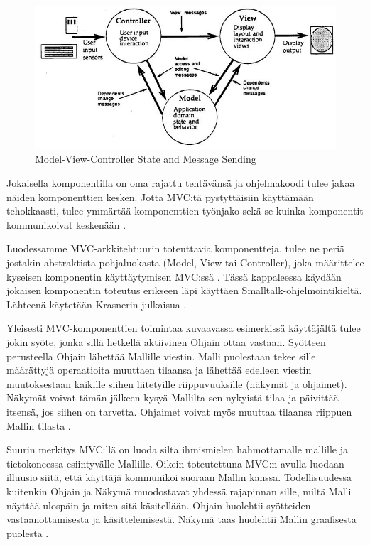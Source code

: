 \documentclass[utf8]{gradu3}
\begin{document}
\begin{figure}[h]
\centering
\includegraphics[scale=0.85]{krasner_mvc.jpg}
\caption{Model-View-Controller State and Message Sending \parencite[s. 5]{krasner_desc}}
\end{figure} 
Jokaisella komponentilla on oma rajattu tehtävänsä ja ohjelmakoodi tulee jakaa näiden komponenttien kesken. Jotta MVC:tä pystyttäisiin käyttämään
tehokkaasti, tulee ymmärtää komponenttien työnjako sekä se kuinka komponentit kommunikoivat keskenään \parencite{burbeck}. 

Luodessamme MVC-arkkitehtuurin toteuttavia komponentteja, tulee ne periä jostakin abstraktista pohjaluokasta (Model, View tai Controller), joka määrittelee kyseisen komponentin käyttäytymisen MVC:ssä \parencite[s. 5]{krasner_desc}. Tässä kappaleessa käydään jokaisen komponentin toteutus erikseen läpi käyttäen Smalltalk-ohjelmointikieltä. Lähteenä käytetään Krasnerin julkaisua \parencite{krasner_desc}.

Yleisesti MVC-komponenttien toimintaa kuvaavassa esimerkissä käyttäjältä tulee jokin syöte, jonka sillä hetkellä aktiivinen Ohjain ottaa vastaan. Syötteen perusteella Ohjain lähettää Mallille viestin. Malli puolestaan tekee sille määrättyjä operaatioita muuttaen tilaansa ja lähettää edelleen viestin muutoksestaan kaikille siihen liitetyille riippuvuuksille (näkymät ja ohjaimet). Näkymät
voivat tämän jälkeen kysyä Mallilta sen nykyistä tilaa ja päivittää itsensä, jos siihen on tarvetta. Ohjaimet voivat myös muuttaa tilaansa riippuen Mallin tilasta \parencite[s. 4]{krasner_desc}. 

Suurin merkitys MVC:llä on luoda silta ihmismielen hahmottamalle mallille ja tietokoneessa esiintyvälle Mallille. Oikein toteutettuna MVC:n avulla luodaan illuusio siitä, että käyttäjä kommunikoi suoraan Mallin kanssa. Todellisuudessa kuitenkin Ohjain ja Näkymä muodostavat yhdessä rajapinnan sille, miltä Malli näyttää ulospäin ja miten sitä käsitellään. Ohjain huolehtii syötteiden vastaanottamisesta ja käsittelemisestä. Näkymä taas huolehtii Mallin graafisesta puolesta \parencite[s. 11-12]{reenskaug_tools}.
\end{document}
